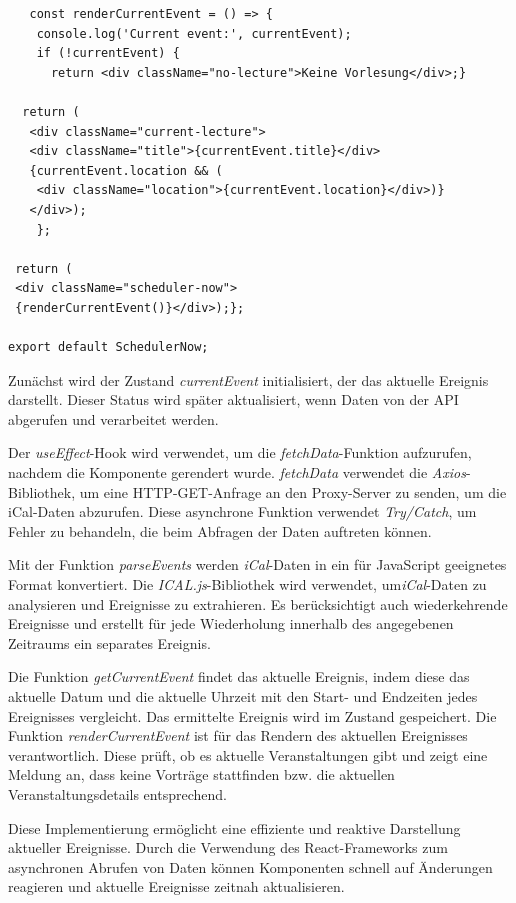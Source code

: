\begin{lstlisting}
   const renderCurrentEvent = () => {
   	console.log('Current event:', currentEvent);
   	if (!currentEvent) {
   	  return <div className="no-lecture">Keine Vorlesung</div>;}
     
  return (
   <div className="current-lecture">
   <div className="title">{currentEvent.title}</div>
   {currentEvent.location && (
   	<div className="location">{currentEvent.location}</div>)}
   </div>);
    };
 
 return (
 <div className="scheduler-now">
 {renderCurrentEvent()}</div>);};

export default SchedulerNow;
\end{lstlisting}

Zunächst wird der Zustand \emph{currentEvent} initialisiert, der das aktuelle Ereignis darstellt. Dieser Status wird später aktualisiert, wenn Daten von der API abgerufen und verarbeitet werden.

Der \emph{useEffect}-Hook wird verwendet, um die \emph{fetchData}-Funktion aufzurufen, nachdem die Komponente gerendert wurde. \emph{fetchData} verwendet die \emph{Axios}-Bibliothek, um eine HTTP-GET-Anfrage an den Proxy-Server zu senden, um die iCal-Daten abzurufen. Diese asynchrone Funktion verwendet \emph{Try/Catch}, um Fehler zu behandeln, die beim Abfragen der Daten auftreten können.

Mit der Funktion \emph{parseEvents} werden \emph{iCal}-Daten in ein für JavaScript geeignetes Format konvertiert. Die \emph{ICAL.js}-Bibliothek wird verwendet, um\emph{iCal}-Daten zu analysieren und Ereignisse zu extrahieren. Es berücksichtigt auch wiederkehrende Ereignisse und erstellt für jede Wiederholung innerhalb des angegebenen Zeitraums ein separates Ereignis.

Die Funktion \emph{getCurrentEvent} findet das aktuelle Ereignis, indem diese das aktuelle Datum und die aktuelle Uhrzeit mit den Start- und Endzeiten jedes Ereignisses vergleicht. Das ermittelte Ereignis wird im Zustand gespeichert. Die Funktion \emph{renderCurrentEvent} ist für das Rendern des aktuellen Ereignisses verantwortlich. Diese prüft, ob es aktuelle Veranstaltungen gibt und zeigt eine Meldung an, dass keine Vorträge stattfinden bzw. die aktuellen Veranstaltungsdetails entsprechend. 

Diese Implementierung ermöglicht eine effiziente und reaktive Darstellung aktueller Ereignisse. Durch die Verwendung des React-Frameworks zum asynchronen Abrufen von Daten können Komponenten schnell auf Änderungen reagieren und aktuelle Ereignisse zeitnah aktualisieren.

